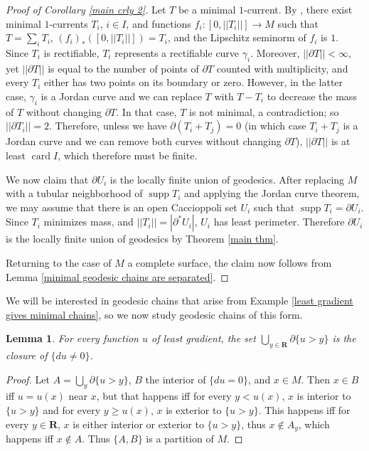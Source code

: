 \documentclass[reqno,12pt,letterpaper]{amsart}
\newcommand{\RR}{\mathbf{R}}
\DeclareMathOperator{\card}{card}
\DeclareMathOperator{\supp}{supp}
\newtheorem{lemma}[theorem]{Lemma}
\theoremstyle{definition}
\numberwithin{equation}{section}
\begin{document}
\begin{proof}[Proof of Corollary \ref{main crly 2}]
Let $T$ be a minimal $1$-current.
By \cite[\S4.2.25]{federer2014geometric}, there exist minimal $1$-currents $T_i$, $i \in I$,
and functions $f_i: [0, ||T_i||] \to M$ such that $T = \sum_i T_i$, $(f_i)_*([0, ||T_i||]) = T_i$, and the Lipschitz seminorm of $f_i$ is $1$.
Since $T_i$ is rectifiable, $T_i$ represents a rectifiable curve $\gamma_i$.
Moreover, $||\partial T|| < \infty$, yet $||\partial T||$ is equal to the number of points of $\partial T$ counted with multiplicity, and every $T_i$ either has two points on its boundary or zero.
However, in the latter case, $\gamma_i$ is a Jordan curve and we can replace $T$ with $T - T_i$ to decrease the mass of $T$ without changing $\partial T$.
In that case, $T$ is not minimal, a contradiction; so $||\partial T_i|| = 2$.
Therefore, unless we have $\partial(T_i + T_j) = 0$ (in which case $T_i + T_j$ is a Jordan curve and we can remove both curves without changing $\partial T$), $||\partial T||$ is at least $\card I$, which therefore must be finite.

We now claim that $\partial U_i$ is the locally finite union of geodesics.
After replacing $M$ with a tubular neighborhood of $\supp T_i$ and applying the Jordan curve theorem, we may assume that there is an open Caccioppoli set $U_i$ such that $\supp T_i = \partial U_i$.
Since $T_i$ minimizes mass, and $||T_i|| = |\partial^* U_i|$, $U_i$ has least perimeter.
Therefore $\partial U_i$ is the locally finite union of geodesics by Theorem \ref{main thm}.

Returning to the case of $M$ a complete surface, the claim now follows from Lemma \ref{minimal geodesic chains are separated}.
\end{proof}

We will be interested in geodesic chains that arise from Example \ref{least gradient gives minimal chains}, so we now study geodesic chains of this form.

\begin{lemma}\label{geodesic foliation is closed}
For every function $u$ of least gradient, the set $\bigcup_{y \in \RR} \partial \{u > y\}$ is the closure of $\{du \neq 0\}$.
\end{lemma}
\begin{proof}
Let $A = \bigcup_y \partial \{u > y\}$, $B$ the interior of $\{du = 0\}$, and $x \in M$.
Then $x \in B$ iff $u = u(x)$ near $x$, but that happens iff for every $y < u(x)$, $x$ is interior to $\{u > y\}$ and for every $y \geq u(x)$, $x$ is exterior to $\{u > y\}$.
This happens iff for every $y \in \RR$, $x$ is either interior or exterior to $\{u > y\}$, thus $x \notin A_y$, which happens iff $x \notin A$.
Thus $\{A, B\}$ is a partition of $M$.
\end{proof}
\end{document}
